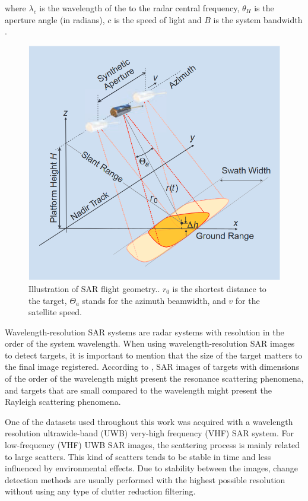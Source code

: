\noindent
where $\lambda_c$ is the wavelength of the to the radar central frequency, $\theta_H$
is the aperture angle (in radians), $c$ is the speed of light and $B$ is the system bandwidth \cite{62}.

\begin{figure}[H]
    \centering
    \includegraphics[width=0.8\linewidth]{Cap1-Bib-Review/geometry.png}
    \caption{Illustration of SAR flight geometry.. $r_0$ is the shortest distance to the target, $\Theta_a$ stands for the azimuth beamwidth, and $v$ for the satellite speed. \cite{tutorial}}
    \label{fig:SAR_geometry}
\end{figure}{}

Wavelength-resolution SAR systems are radar systems with resolution in the order of the system wavelength. When using wavelength-resolution SAR images to detect targets, it is important to mention that the size of the target matters to the final image registered. According to \cite{63}, SAR images of targets with dimensions of the order of the wavelength might present the resonance scattering phenomena, and targets that are small compared to the wavelength might present the Rayleigh scattering phenomena. 

One of the datasets used throughout this work was acquired with a wavelength resolution ultrawide-band (UWB) very-high frequency (VHF) SAR system.  For low-frequency (VHF) UWB SAR images, the scattering process is mainly related to large scatters. This kind of scatters tends to be stable in time and less influenced by environmental effects. Due to stability between the images, change detection methods are usually performed with the highest possible resolution without using any type of clutter reduction filtering.  

